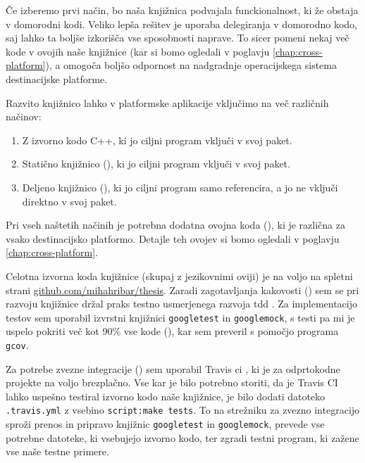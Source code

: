 Če izberemo prvi način, bo naša knjižnica podvajala funckionalnost, ki že obstaja v domorodni kodi. Veliko lepša rešitev je uporaba delegiranja v domorodno kodo, saj lahko ta boljše izkorišča vse sposobnosti naprave. To sicer pomeni nekaj več kode v ovojih naše knjižnice (kar si bomo ogledali v poglavju \ref{chap:cross-platform}), a omogoča boljšo odpornost na nadgradnje operacijskega sistema destinacijske platforme.

Razvito knjižnico lahko v platformske aplikacije vključimo na več različnih načinov:

\begin{enumerate}
  \item Z izvorno kodo C++, ki jo ciljni program vključi v svoj paket.
  \item Statično knjižnico (), ki jo ciljni program vključi v svoj paket.
  \item Deljeno knjižnico (), ki jo ciljni program samo referencira, a jo ne vključi direktno v svoj paket.
\end{enumerate}

Pri vseh naštetih načinih je potrebna dodatna ovojna koda (), ki je različna za vsako destinacijsko platformo. Detajle teh ovojev si bomo ogledali v poglavju \ref{chap:cross-platform}.

Celotna izvorna koda knjižnice (skupaj z jezikovnimi oviji) je na voljo na spletni strani \href{https://github.com/mihahribar/thesis}{github.com/mihahribar/thesis}. Zaradi zagotavljanja kakovosti () sem se pri razvoju knjižnice držal praks testno usmerjenega razvoja \gls{tdd} \cite{tdd-cpp}. Za implementacijo testov sem uporabil izvrstni knjižnici \texttt{googletest}\cite{googletest} in \texttt{googlemock}\cite{googlemock}, s testi pa mi je uspelo pokriti več kot 90\% vse kode (), kar sem preveril s pomočjo programa \texttt{gcov}.

Za potrebe zvezne integracije () sem uporabil Travis \gls{ci} \cite{travisci}, ki je za odprtokodne projekte na voljo brezplačno. Vse kar je bilo potrebno storiti, da je Travis CI lahko uspešno testiral izvorno kodo naše knjižnice, je bilo dodati datoteko \texttt{.travis.yml} z vsebino \texttt{script:make tests}. To na strežniku za zvezno integracijo sproži prenos in pripravo knjižnic \texttt{googletest} in \texttt{googlemock}, prevede vse potrebne datoteke, ki vsebujejo izvorno kodo, ter zgradi testni program, ki zažene vse naše testne primere.

